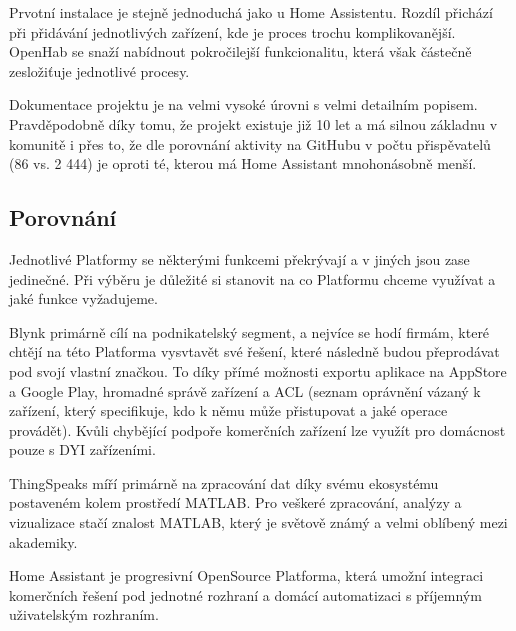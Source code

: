 Prvotní instalace je stejně jednoduchá jako u Home Assistentu. Rozdíl přichází při přidávání jednotlivých zařízení, kde je proces trochu komplikovanější. OpenHab se snaží nabídnout pokročilejší funkcionalitu, která však částečně zesložiťuje jednotlivé procesy. \cite{openhab-doc}

Dokumentace projektu je na velmi vysoké úrovni s velmi detailním popisem. Pravděpodobně díky tomu, že projekt existuje již 10 let a má silnou základnu v komunitě i přes to, že dle porovnání aktivity na GitHubu v počtu přispěvatelů (86 vs. 2 444) je oproti té, kterou má Home Assistant mnohonásobně menší.

\subsection{Porovnání}
Jednotlivé Platformy se některými funkcemi překrývají a v jiných jsou zase jedinečné. Při výběru je důležité si stanovit na co Platformu chceme využívat a jaké funkce vyžadujeme.

Blynk primárně cílí na podnikatelský segment, a nejvíce se hodí firmám, které chtějí na této Platforma vysvtavět své řešení, které následně budou přeprodávat pod svojí vlastní značkou. To díky přímé možnosti exportu aplikace na AppStore a Google Play, hromadné správě zařízení a ACL (seznam oprávnění vázaný k zařízení, který specifikuje, kdo k němu může přistupovat a jaké operace provádět). Kvůli chybějící podpoře komerčních zařízení lze využít pro domácnost pouze s DYI zařízeními.

ThingSpeaks míří primárně na zpracování dat díky svému ekosystému postaveném kolem prostředí MATLAB. Pro veškeré zpracování, analýzy a vizualizace stačí znalost MATLAB, který je světově známý a velmi oblíbený mezi akademiky.

Home Assistant je progresivní OpenSource Platforma, která umožní integraci komerčních řešení pod jednotné rozhraní a domácí automatizaci s příjemným uživatelským rozhraním.

